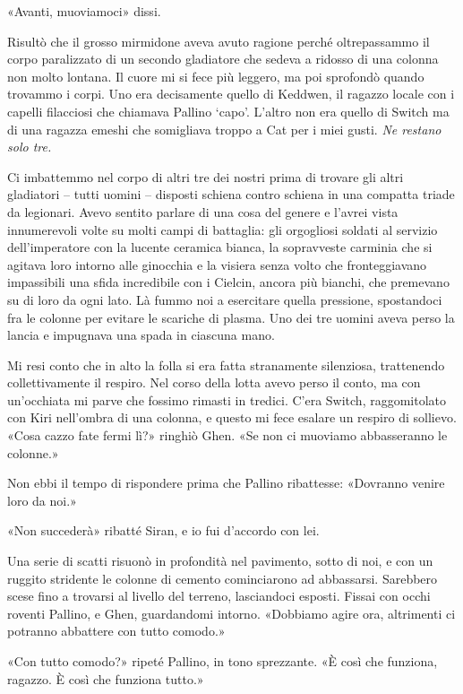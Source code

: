 «Avanti, muoviamoci» dissi.

Risultò che il grosso mirmidone aveva avuto ragione perché oltrepassammo
il corpo paralizzato di un secondo gladiatore che sedeva a ridosso di
una colonna non molto lontana. Il cuore mi si fece più leggero, ma poi
sprofondò quando trovammo i corpi. Uno era decisamente quello di
Keddwen, il ragazzo locale con i capelli filacciosi che chiamava Pallino
`capo'. L'altro non era quello di Switch ma di una ragazza emeshi che
somigliava troppo a Cat per i miei gusti. \emph{Ne restano solo tre.}

Ci imbattemmo nel corpo di altri tre dei nostri prima di trovare gli
altri gladiatori -- tutti uomini -- disposti schiena contro schiena in
una compatta triade da legionari. Avevo sentito parlare di una cosa del
genere e l'avrei vista innumerevoli volte su molti campi di battaglia:
gli orgogliosi soldati al servizio dell'imperatore con la lucente
ceramica bianca, la sopravveste carminia che si agitava loro intorno
alle ginocchia e la visiera senza volto che fronteggiavano impassibili
una sfida incredibile con i Cielcin, ancora più bianchi, che premevano
su di loro da ogni lato. Là fummo noi a esercitare quella pressione,
spostandoci fra le colonne per evitare le scariche di plasma. Uno dei
tre uomini aveva perso la lancia e impugnava una spada in ciascuna mano.

Mi resi conto che in alto la folla si era fatta stranamente silenziosa,
trattenendo collettivamente il respiro. Nel corso della lotta avevo
perso il conto, ma con un'occhiata mi parve che fossimo rimasti in
tredici. C'era Switch, raggomitolato con Kiri nell'ombra di una colonna,
e questo mi fece esalare un respiro di sollievo. «Cosa cazzo fate fermi
lì?» ringhiò Ghen. «Se non ci muoviamo abbasseranno le colonne.»

Non ebbi il tempo di rispondere prima che Pallino ribattesse: «Dovranno
venire loro da noi.»

«Non succederà» ribatté Siran, e io fui d'accordo con lei.

Una serie di scatti risuonò in profondità nel pavimento, sotto di noi, e
con un ruggito stridente le colonne di cemento cominciarono ad
abbassarsi. Sarebbero scese fino a trovarsi al livello del terreno,
lasciandoci esposti. Fissai con occhi roventi Pallino, e Ghen,
guardandomi intorno. «Dobbiamo agire ora, altrimenti ci potranno
abbattere con tutto comodo.»

«Con tutto comodo?» ripeté Pallino, in tono sprezzante. «È così che
funziona, ragazzo. È così che funziona tutto.»

